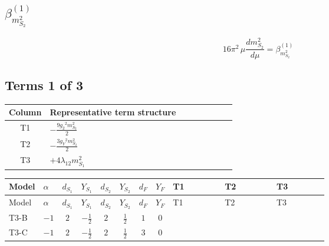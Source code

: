 \documentclass[8pt]{article}
\begin{document}
\begin{landscape}
\section*{$\beta_{m_{S_2}^2}^{(1)}$}
\[16\pi^2\,\mu\frac{d m_{S_2}^2}{d\mu}=\beta_{m_{S_2}^2}^{(1)}\]
\subsection*{Terms 1 of 3}
\begin{center}
\begin{tabular}{@{}c >{\raggedright\arraybackslash}p{0.82\linewidth}@{}}
\toprule
Column & Representative term structure \\
\midrule
T1 & \(\displaystyle -\frac{9 {g_2}^2 {m_{S_2}^2}}{2}\) \\
\midrule
T2 & \(\displaystyle -\frac{3 {g_Y}^2 {m_{S_2}^2}}{2}\) \\
\midrule
T3 & \(\displaystyle +4 {\lambda_{12}} {m_{S_1}^2}\) \\
\midrule
\bottomrule
\end{tabular}
\end{center}
\smallskip
\tiny
\begin{longtable}{@{}llcccccc >{\raggedright\arraybackslash}p{0.21\linewidth} >{\raggedright\arraybackslash}p{0.21\linewidth} >{\raggedright\arraybackslash}p{0.21\linewidth}@{}}
\toprule
Model & $\alpha$ & $d_{S_1}$ & $Y_{S_1}$ & $d_{S_2}$ & $Y_{S_2}$ & $d_F$ & $Y_F$ & T1 & T2 & T3 \\
\midrule
\endfirsthead
\toprule
Model & $\alpha$ & $d_{S_1}$ & $Y_{S_1}$ & $d_{S_2}$ & $Y_{S_2}$ & $d_F$ & $Y_F$ & T1 & T2 & T3 \\
\midrule
\endhead
T3-B & $-1$ & $2$ & $-\frac{1}{2}$ & $2$ & $\frac{1}{2}$ & $1$ & $0$ & \scriptsize\adjustbox{max width=\linewidth}{$\begin{gathered} -\frac{9 {g_2}^2 {m_{S_2}^2}}{2}\end{gathered}$} & \scriptsize\adjustbox{max width=\linewidth}{$\begin{gathered} -\frac{3 {g_Y}^2 {m_{S_2}^2}}{2}\end{gathered}$} & \scriptsize\adjustbox{max width=\linewidth}{$\begin{gathered} +4 {\lambda_{12}} {m_{S_1}^2}\end{gathered}$} \\
\midrule
T3-C & $-1$ & $2$ & $-\frac{1}{2}$ & $2$ & $\frac{1}{2}$ & $3$ & $0$ & \scriptsize\adjustbox{max width=\linewidth}{$\begin{gathered} -\frac{9 {g_2}^2 {m_{S_2}^2}}{2}\end{gathered}$} & \scriptsize\adjustbox{max width=\linewidth}{$\begin{gathered} -\frac{3 {g_Y}^2 {m_{S_2}^2}}{2}\end{gathered}$} & \scriptsize\adjustbox{max width=\linewidth}{$\begin{gathered} +4 {\lambda_{12}} {m_{S_1}^2}\end{gathered}$} \\

\end{longtable}
\end{landscape}
\end{document}
